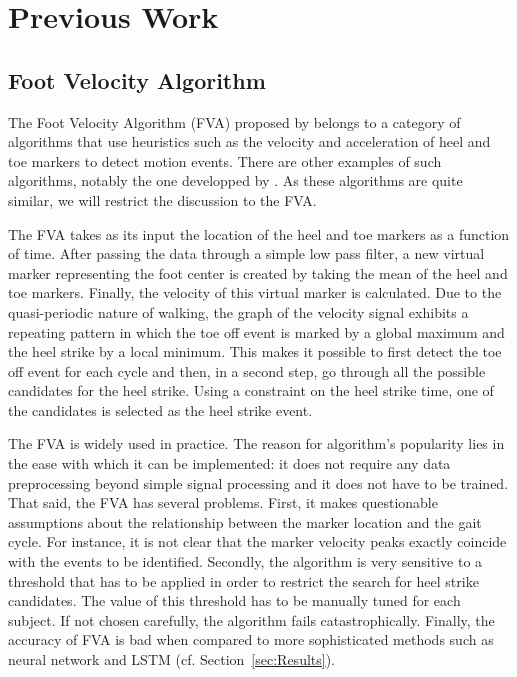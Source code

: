 \documentclass{acm_proc_article-sp}
\begin{document}
\section{Previous Work}
\label{sec:Previous Work}

\subsection{Foot Velocity Algorithm}
\label{sub:Foot Velocity Algorithm}

The Foot Velocity Algorithm (FVA) proposed by
\cite{OConnor2007}
belongs to a category of algorithms that use heuristics such as the velocity
and acceleration of heel and toe markers to detect motion events.
There are other examples of such algorithms, notably the one developped by
\cite{Hreljac2000}.
As these algorithms are quite similar, we will restrict the discussion
to the FVA.

The FVA takes as its input the location of the heel and toe markers as a
function of time.
After passing the data through a simple low pass filter,
a new virtual marker representing the foot center is created by taking the mean
of the heel and toe markers.
Finally, the velocity of this virtual marker is calculated.
Due to the quasi-periodic nature of walking, the graph of the velocity signal
exhibits a repeating pattern in which the toe off event is marked by a global
maximum and the heel strike by a local minimum.
This makes it possible to first detect the toe off event for each cycle and
then, in a second step, go through all the possible candidates for the heel
strike.
Using a constraint on the heel strike time, one of the candidates is selected
as the heel strike event.

The FVA is widely used in practice.
The reason for algorithm's popularity lies in the ease with which it can be
implemented:
it does not require any data preprocessing beyond simple signal processing and
it does not have to be trained.
That said, the FVA has several problems.
First, it makes questionable assumptions about the relationship between the
marker location and the gait cycle.
For instance, it is not clear that the marker velocity peaks exactly coincide
with the events to be identified.
Secondly, the algorithm is very sensitive to a threshold that has to be applied
in order to restrict the search for heel strike candidates.
The value of this threshold has to be manually tuned for each subject.
If not chosen carefully, the algorithm fails catastrophically.
Finally, the accuracy of FVA is bad when compared to more sophisticated methods
such as neural network and LSTM
(cf. Section~\ref{sec:Results}).
\end{document}
